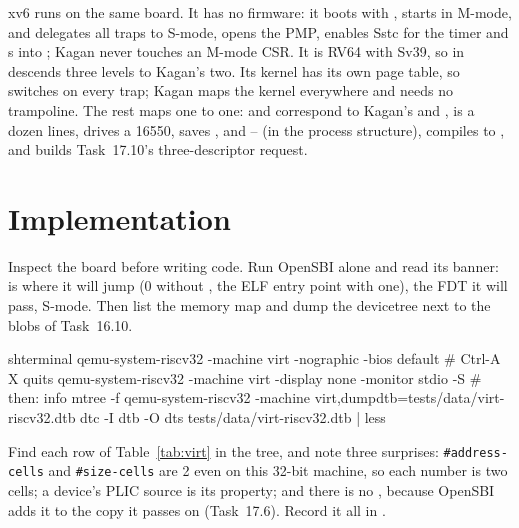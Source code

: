 \documentclass[11pt,a4paper]{article}
\begin{document}
\begin{minixbox}
xv6 runs on the same board. It has no firmware: it boots with ,  starts in
M-mode, and  delegates all traps to S-mode, opens the PMP, enables Sstc for the timer and s
into ; Kagan never touches an M-mode CSR. It is RV64 with Sv39, so  in 
descends three levels to Kagan's two. Its kernel has its own page table, so  switches  on
every trap; Kagan maps the kernel everywhere and needs no trampoline. The rest maps one to one: 
and  correspond to Kagan's  and ,  is a dozen lines,  drives a
16550,  saves ,  and -- (in the process structure),
 compiles to , and  builds Task~17.10's three-descriptor request.
\end{minixbox}

\section{Implementation}

Inspect the board before writing code. Run OpenSBI alone and read its banner:  is where it will jump (0
without , the ELF entry point with one),  the FDT it will pass,  S-mode.
Then list the memory map and dump the devicetree next to the blobs of Task~16.10.

\begin{lst}{sh}{terminal}
qemu-system-riscv32 -machine virt -nographic -bios default       # Ctrl-A X quits
qemu-system-riscv32 -machine virt -display none -monitor stdio -S # then: info mtree -f
qemu-system-riscv32 -machine virt,dumpdtb=tests/data/virt-riscv32.dtb
dtc -I dtb -O dts tests/data/virt-riscv32.dtb | less
\end{lst}

Find each row of Table~\ref{tab:virt} in the tree, and note three surprises: \texttt{\#address-cells} and
\texttt{\#size-cells} are 2 even on this 32-bit machine, so each  number is two cells; a device's PLIC source
is its  property; and there is no , because OpenSBI adds it to the copy it
passes on (Task~17.6). Record it all in .
\end{document}
